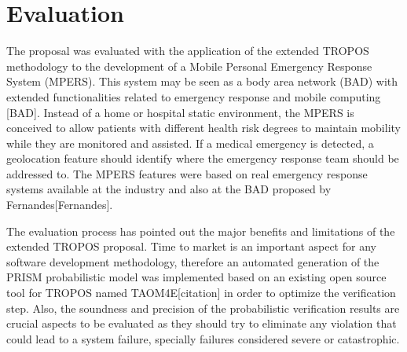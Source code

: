 


\section{Evaluation}

The proposal was evaluated with the application of the extended TROPOS methodology to the development of a Mobile Personal Emergency Response System (MPERS). This system may be seen as a body area network (BAD) with extended functionalities related to emergency response and mobile computing [BAD]. Instead of a home or hospital static environment, the MPERS is conceived to allow patients with different health risk degrees to maintain mobility while they are monitored and assisted. If a medical emergency is detected, a geolocation feature should identify where the emergency response team should be addressed to. The MPERS features were based on real emergency response systems available at the industry and also at the BAD proposed by Fernandes[Fernandes].

The evaluation process has pointed out the major benefits and limitations of the extended TROPOS proposal. Time to market is an important aspect for any software development methodology, therefore an automated generation of the PRISM probabilistic model was implemented based on an existing open source tool for TROPOS named TAOM4E[citation] in order to optimize the verification step. Also, the soundness and precision of the probabilistic verification results are crucial aspects to be evaluated as they should try to eliminate any violation that could lead to a system failure, specially failures considered severe or catastrophic.


